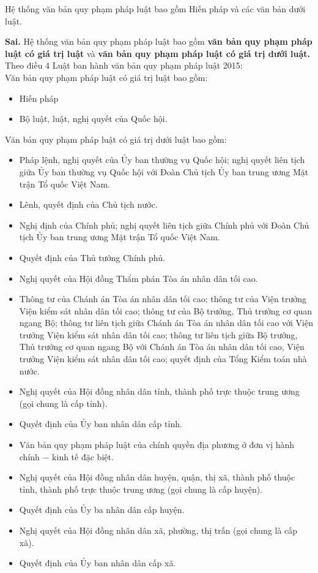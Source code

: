 \begin{ques}
Hệ thống văn bản quy phạm pháp luật bao gồm Hiến pháp và các văn bản dưới luật.
\end{ques}
\begin{ans}
\textbf{Sai.} Hệ thống văn bản quy phạm pháp luật bao gồm \textbf{văn bản quy phạm pháp luật có giá trị luật} và \textbf{văn bản quy phạm pháp luật có giá trị dưới luật.}\\
Theo điều 4 Luật ban hành văn bản quy phạm pháp luật 2015:\\
Văn bản quy phạm pháp luật có giá trị luật bao gồm:
\begin{itemize}
\item Hiến pháp
\item Bộ luật, luật, nghị quyết của Quốc hội.
\end{itemize}
Văn bản quy phạm pháp luật có giá trị dưới luật bao gồm:
\begin{itemize}
\item Pháp lệnh, nghị quyết của Ủy ban thường vụ Quốc hội; nghị quyết liên tịch giữa Ủy ban thường vụ Quốc hội với Đoàn Chủ tịch Ủy ban trung ương Mặt trận Tổ quốc Việt Nam.
\item Lênh, quyết định của Chủ tịch nước.
\item Nghị định của Chính phủ; nghị quyết liên tịch giữa Chính phủ với Đoàn Chủ tịch Ủy ban trung ương Mặt trận Tổ quốc Việt Nam.
\item Quyết định của Thủ tướng Chính phủ.
\item Nghị quyết của Hội đồng Thẩm phán Tòa án nhân dân tối cao.
\item Thông tư của Chánh án Tòa án nhân dân tối cao; thông tư của Viện trưởng Viện kiểm sát nhân dân tối cao; thông tư của Bộ trưởng, Thủ trưởng cơ quan ngang Bộ; thông tư liên tịch giữa Chánh án Tòa án nhân dân tối cao với Viện trưởng Viện kiểm sát nhân dân tối cao; thông tư liên tịch giữa Bộ trưởng, Thủ trưởng cơ quan ngang Bộ với Chánh án Tòa án nhân dân tối cao, Viện trưởng Viện kiểm sát nhân dân tối cao; quyết định của Tổng Kiểm toán nhà nước.
\item Nghị quyết của Hội đồng nhân dân tỉnh, thành phố trực thuộc trung ương (gọi chung là cấp tỉnh).
\item Quyết định của Ủy ban nhân dân cấp tỉnh.
\item Văn bản quy phạm pháp luật của chính quyền địa phương ở đơn vị hành chính $-$ kinh tế đặc biệt.
\item Nghị quyết của Hội đồng nhân dân huyện, quận, thị xã, thành phố thuộc tỉnh, thành phố trực thuộc trung ương (gọi chung là cấp huyện).
\item Quyết định của Ủy ba nhân dân cấp huyện.
\item Nghị quyết của Hội đồng nhân dân xã, phường, thị trấn (gọi chung là cấp xã).
\item Quyết định của Ủy ban nhân dân cấp xã.
\end{itemize}
\end{ans}

